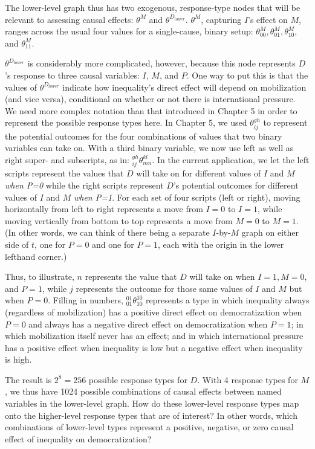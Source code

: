 \documentclass[12pt,]{book}
\begin{document}
The lower-level graph thus has two exogenous, response-type nodes that will be relevant to assessing causal effects: \(\theta^M\) and \(\theta^{D_{lower}}\). \(\theta^M\), capturing \(I\)'s effect on \(M\), ranges across the usual four values for a single-cause, binary setup: \(\theta_{00}^M, \theta_{01}^M, \theta_{10}^M\), and \(\theta_{11}^M\).

\(\theta^{D_{lower}}\) is considerably more complicated, however, because this node represents \(D\)'s response to three causal variables: \(I\), \(M\), and \(P\). One way to put this is that the values of \(\theta^{D_{lower}}\) indicate how inequality's direct effect will depend on mobilization (and vice versa), conditional on whether or not there is international pressure. We need more complex notation than that introduced in Chapter 5 in order to represent the possible response types here. In Chapter 5, we used \(\theta_{ij}^{gh}\) to represent the potential outcomes for the four combinations of values that two binary variables can take on. With a third binary variable, we now use left as well as right super- and subscripts, as in: \(_{ij}^{gh}\theta_{mn}^{kl}\). In the current application, we let the left scripts represent the values that \(D\) will take on for different values of \(I\) and \(M\) \emph{when P=0} while the right scripts represent \(D\)'s potential outcomes for different values of \(I\) and \(M\) \emph{when P=1}. For each set of four scripts (left or right), moving horizontally from left to right represents a move from \(I=0\) to \(I=1\), while moving vertically from bottom to top represents a move from \(M=0\) to \(M=1\). (In other words, we can think of there being a separate \(I\)-by-\(M\) graph on either side of \(t\), one for \(P=0\) and one for \(P=1\), each with the origin in the lower lefthand corner.)

Thus, to illustrate, \(n\) represents the value that \(D\) will take on when \(I=1, M=0\), and \(P=1\), while \(j\) represents the outcome for those same values of \(I\) and \(M\) but when \(P=0\). Filling in numbers, \(_{01}^{01}\theta_{10}^{10}\) represents a type in which inequality always (regardless of mobilization) has a positive direct effect on democratization when \(P=0\) and always has a negative direct effect on democratization when \(P=1\); in which mobilization itself never has an effect; and in which international pressure has a positive effect when inequality is low but a negative effect when inequality is high.

The result is \(2^8=256\) possible response types for \(D\). With 4 response types for \(M\), we thus have 1024 possible combinations of causal effects between named variables in the lower-level graph. How do these lower-level response types map onto the higher-level response types that are of interest? In other words, which combinations of lower-level types represent a positive, negative, or zero causal effect of inequality on democratization?
\end{document}
